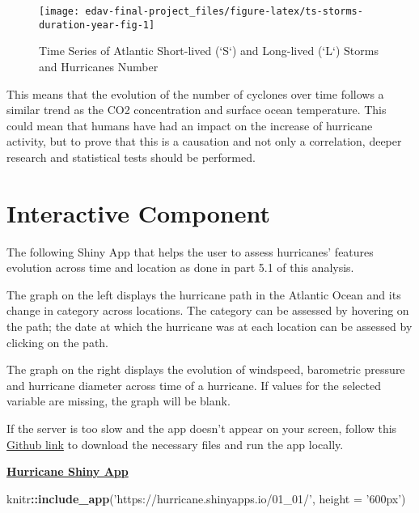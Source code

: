 \documentclass[]{book}
\newenvironment{Shaded}{\begin{snugshade}}{\end{snugshade}}
\newcommand{\DataTypeTok}[1]{\textcolor[rgb]{0.13,0.29,0.53}{#1}}
\newcommand{\KeywordTok}[1]{\textcolor[rgb]{0.13,0.29,0.53}{\textbf{#1}}}
\newcommand{\NormalTok}[1]{#1}
\newcommand{\OperatorTok}[1]{\textcolor[rgb]{0.81,0.36,0.00}{\textbf{#1}}}
\newcommand{\StringTok}[1]{\textcolor[rgb]{0.31,0.60,0.02}{#1}}
\begin{document}
\begin{figure}

{\centering \texttt{[image: edav-final-project\_files/figure-latex/ts-storms-duration-year-fig-1]} 

}

\caption{Time Series of Atlantic Short-lived (`S`) and Long-lived (`L`) Storms and Hurricanes Number}\label{fig:ts-storms-duration-year-fig}
\end{figure}

This means that the evolution of the number of cyclones over time follows a similar trend as the CO2 concentration and surface ocean temperature. This could mean that humans have had an impact on the increase of hurricane activity, but to prove that this is a causation and not only a correlation, deeper research and statistical tests should be performed.

\hypertarget{intercom}{%
\chapter{Interactive Component}\label{intercom}}

The following Shiny App that helps the user to assess hurricanes' features evolution across time and location as done in part 5.1 of this analysis.

The graph on the left displays the hurricane path in the Atlantic Ocean and its change in category across locations. The category can be assessed by hovering on the path; the date at which the hurricane was at each location can be assessed by clicking on the path.

The graph on the right displays the evolution of windspeed, barometric pressure and hurricane diameter across time of a hurricane. If values for the selected variable are missing, the graph will be blank.

If the server is too slow and the app doesn't appear on your screen, follow this \href{https://github.com/jqz300/edav_proj}{Github link} to download the necessary files and run the app locally.

\href{https://hurricane.shinyapps.io/01_01/}{\textbf{Hurricane Shiny App}}

\begin{Shaded}
\begin{Highlighting}[]
\NormalTok{knitr}\OperatorTok{::}\KeywordTok{include_app}\NormalTok{(}\StringTok{'https://hurricane.shinyapps.io/01_01/'}\NormalTok{, }\DataTypeTok{height =} \StringTok{'600px'}\NormalTok{)}
\end{Highlighting}
\end{Shaded}
\end{document}
